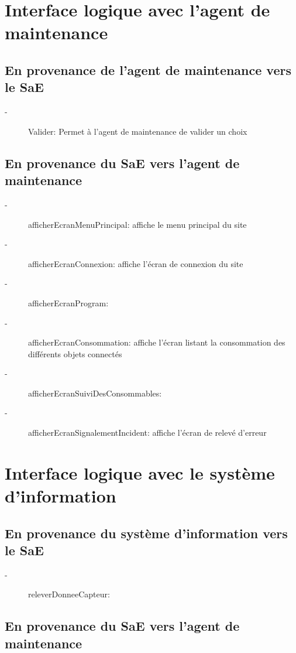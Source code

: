 \documentclass[10pt,a4paper]{report}
\begin{document}
		\section{Interface logique avec l'agent de maintenance}
			\subsection{En provenance de l'agent de maintenance vers le SaE}
			
\begin{description}
	\item[-] Valider: Permet à l'agent de maintenance de valider un choix
\end{description}
			
			\subsection{En provenance du SaE vers l'agent de maintenance}
			
\begin{description}
	\item[-] afficherEcranMenuPrincipal: affiche le menu principal du site
	\item[-] afficherEcranConnexion: affiche l'écran de connexion du site 
	\item[-] afficherEcranProgram: 
	\item[-] afficherEcranConsommation: affiche l'écran listant la consommation des différents objets connectés
	\item[-] afficherEcranSuiviDesConsommables:
	\item[-] afficherEcranSignalementIncident: affiche l'écran de relevé d'erreur 
\end{description}
			
		
		\section{Interface logique avec le système d'information}
			\subsection{En provenance du système d'information vers le SaE}
			
\begin{description}
	\item[-] releverDonneeCapteur:
\end{description}
			
			\subsection{En provenance du SaE vers l'agent de maintenance}
			
\end{document}
